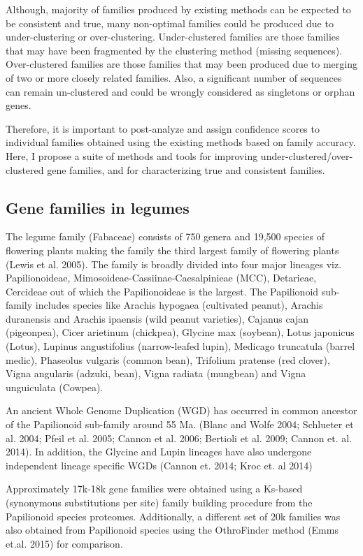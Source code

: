 \documentclass{article}
\begin{document}
		Although, majority of families produced by existing methods can be expected to be consistent and true, many non-optimal families could be produced due to under-clustering or over-clustering. Under-clustered families are those families that may have been fragmented by the clustering method (missing sequences). Over-clustered families are those families that may been produced due to merging of two or more closely related families. Also, a significant number of sequences can remain un-clustered and could be wrongly considered as singletons or orphan genes. 
		
		Therefore, it is important to post-analyze and assign confidence scores to individual families obtained using the existing methods based on family accuracy. Here, I propose a suite of methods and tools for improving under-clustered/over-clustered gene families, and for characterizing true and consistent families.
		
		\subsection{Gene families in legumes}
		The legume family (Fabaceae) consists of 750 genera and 19,500 species of flowering plants making the family the third largest family of flowering plants (Lewis et al. 2005). The family is broadly divided into four major lineages viz. Papilionoideae, Mimosoideae-Cassiinae-Caesalpinieae (MCC), Detarieae, Cercideae out of which the Papilionoideae is the largest. The Papilionoid sub-family includes species like Arachis hypogaea (cultivated peanut), Arachis duranensis and Arachis ipaensis (wild peanut varieties), Cajanus cajan (pigeonpea), Cicer arietinum (chickpea), Glycine max (soybean), Lotus japonicus (Lotus), Lupinus angustifolius (narrow-leafed lupin), Medicago truncatula (barrel medic), Phaseolus vulgaris (common bean), Trifolium pratense (red clover), Vigna angularis (adzuki, bean), Vigna radiata (mungbean) and Vigna unguiculata (Cowpea).
		
		An ancient Whole Genome Duplication (WGD) has occurred in common ancestor of the Papilionoid sub-family around 55 Ma. (Blanc and Wolfe 2004; Schlueter et al. 2004; Pfeil et al. 2005; Cannon et al. 2006; Bertioli et al. 2009; Cannon et. al. 2014). In addition, the Glycine and Lupin lineages have also undergone independent lineage specific WGDs (Cannon et. 2014; Kroc et. al 2014) 
		
		Approximately 17k-18k gene families were obtained using a Ks-based (synonymous substitutions per site) family building procedure from the Papilionoid species proteomes. Additionally,  a different set of 20k families was also obtained from Papilionoid species using the OthroFinder method (Emms et.al. 2015) for comparison.
		\pagebreak
\end{document}
